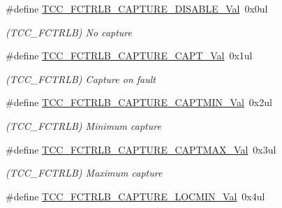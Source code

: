 \begin{DoxyCompactItemize}
\item 
\hypertarget{group___s_a_m_l21___t_c_c_ga67d4df05f009429c2ddbffa7a609eb96}{}\#define \hyperlink{group___s_a_m_l21___t_c_c_ga67d4df05f009429c2ddbffa7a609eb96}{T\+C\+C\+\_\+\+F\+C\+T\+R\+L\+B\+\_\+\+C\+A\+P\+T\+U\+R\+E\+\_\+\+D\+I\+S\+A\+B\+L\+E\+\_\+\+Val}~0x0ul\label{group___s_a_m_l21___t_c_c_ga67d4df05f009429c2ddbffa7a609eb96}

\begin{DoxyCompactList}\small\item\em (T\+C\+C\+\_\+\+F\+C\+T\+R\+L\+B) No capture \end{DoxyCompactList}\item 
\hypertarget{group___s_a_m_l21___t_c_c_ga3f8b5d8c1c5d49b7e304dfa70344319c}{}\#define \hyperlink{group___s_a_m_l21___t_c_c_ga3f8b5d8c1c5d49b7e304dfa70344319c}{T\+C\+C\+\_\+\+F\+C\+T\+R\+L\+B\+\_\+\+C\+A\+P\+T\+U\+R\+E\+\_\+\+C\+A\+P\+T\+\_\+\+Val}~0x1ul\label{group___s_a_m_l21___t_c_c_ga3f8b5d8c1c5d49b7e304dfa70344319c}

\begin{DoxyCompactList}\small\item\em (T\+C\+C\+\_\+\+F\+C\+T\+R\+L\+B) Capture on fault \end{DoxyCompactList}\item 
\hypertarget{group___s_a_m_l21___t_c_c_gad537bb51ea6e26841a7646ac9cc34900}{}\#define \hyperlink{group___s_a_m_l21___t_c_c_gad537bb51ea6e26841a7646ac9cc34900}{T\+C\+C\+\_\+\+F\+C\+T\+R\+L\+B\+\_\+\+C\+A\+P\+T\+U\+R\+E\+\_\+\+C\+A\+P\+T\+M\+I\+N\+\_\+\+Val}~0x2ul\label{group___s_a_m_l21___t_c_c_gad537bb51ea6e26841a7646ac9cc34900}

\begin{DoxyCompactList}\small\item\em (T\+C\+C\+\_\+\+F\+C\+T\+R\+L\+B) Minimum capture \end{DoxyCompactList}\item 
\hypertarget{group___s_a_m_l21___t_c_c_ga49b047996949e583c9d276615c2b2cde}{}\#define \hyperlink{group___s_a_m_l21___t_c_c_ga49b047996949e583c9d276615c2b2cde}{T\+C\+C\+\_\+\+F\+C\+T\+R\+L\+B\+\_\+\+C\+A\+P\+T\+U\+R\+E\+\_\+\+C\+A\+P\+T\+M\+A\+X\+\_\+\+Val}~0x3ul\label{group___s_a_m_l21___t_c_c_ga49b047996949e583c9d276615c2b2cde}

\begin{DoxyCompactList}\small\item\em (T\+C\+C\+\_\+\+F\+C\+T\+R\+L\+B) Maximum capture \end{DoxyCompactList}\item 
\hypertarget{group___s_a_m_l21___t_c_c_ga6fc936694b3fb720f50c91ad57ffb6c3}{}\#define \hyperlink{group___s_a_m_l21___t_c_c_ga6fc936694b3fb720f50c91ad57ffb6c3}{T\+C\+C\+\_\+\+F\+C\+T\+R\+L\+B\+\_\+\+C\+A\+P\+T\+U\+R\+E\+\_\+\+L\+O\+C\+M\+I\+N\+\_\+\+Val}~0x4ul\label{group___s_a_m_l21___t_c_c_ga6fc936694b3fb720f50c91ad57ffb6c3}


\end{DoxyCompactItemize}
